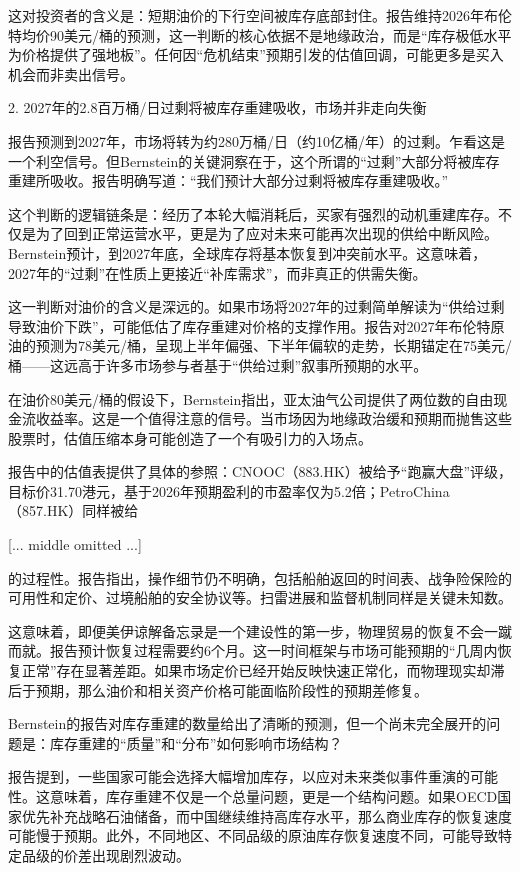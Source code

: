 \documentclass[11pt]{ctexart}
\begin{document}
这对投资者的含义是：短期油价的下行空间被库存底部封住。报告维持2026年布伦特均价90美元/桶的预测，这一判断的核心依据不是地缘政治，而是“库存极低水平为价格提供了强地板”。任何因“危机结束”预期引发的估值回调，可能更多是买入机会而非卖出信号。

2. 2027年的2.8百万桶/日过剩将被库存重建吸收，市场并非走向失衡

报告预测到2027年，市场将转为约280万桶/日（约10亿桶/年）的过剩。乍看这是一个利空信号。但Bernstein的关键洞察在于，这个所谓的“过剩”大部分将被库存重建所吸收。报告明确写道：“我们预计大部分过剩将被库存重建吸收。”

这个判断的逻辑链条是：经历了本轮大幅消耗后，买家有强烈的动机重建库存。不仅是为了回到正常运营水平，更是为了应对未来可能再次出现的供给中断风险。Bernstein预计，到2027年底，全球库存将基本恢复到冲突前水平。这意味着，2027年的“过剩”在性质上更接近“补库需求”，而非真正的供需失衡。

这一判断对油价的含义是深远的。如果市场将2027年的过剩简单解读为“供给过剩导致油价下跌”，可能低估了库存重建对价格的支撑作用。报告对2027年布伦特原油的预测为78美元/桶，呈现上半年偏强、下半年偏软的走势，长期锚定在75美元/桶——这远高于许多市场参与者基于“供给过剩”叙事所预期的水平。

在油价80美元/桶的假设下，Bernstein指出，亚太油气公司提供了两位数的自由现金流收益率。这是一个值得注意的信号。当市场因为地缘政治缓和预期而抛售这些股票时，估值压缩本身可能创造了一个有吸引力的入场点。

报告中的估值表提供了具体的参照：CNOOC（883.HK）被给予“跑赢大盘”评级，目标价31.70港元，基于2026年预期盈利的市盈率仅为5.2倍；PetroChina（857.HK）同样被给

[... middle omitted ...]

的过程性。报告指出，操作细节仍不明确，包括船舶返回的时间表、战争险保险的可用性和定价、过境船舶的安全协议等。扫雷进展和监督机制同样是关键未知数。

这意味着，即便美伊谅解备忘录是一个建设性的第一步，物理贸易的恢复不会一蹴而就。报告预计恢复过程需要约6个月。这一时间框架与市场可能预期的“几周内恢复正常”存在显著差距。如果市场定价已经开始反映快速正常化，而物理现实却滞后于预期，那么油价和相关资产价格可能面临阶段性的预期差修复。

Bernstein的报告对库存重建的数量给出了清晰的预测，但一个尚未完全展开的问题是：库存重建的“质量”和“分布”如何影响市场结构？

报告提到，一些国家可能会选择大幅增加库存，以应对未来类似事件重演的可能性。这意味着，库存重建不仅是一个总量问题，更是一个结构问题。如果OECD国家优先补充战略石油储备，而中国继续维持高库存水平，那么商业库存的恢复速度可能慢于预期。此外，不同地区、不同品级的原油库存恢复速度不同，可能导致特定品级的价差出现剧烈波动。
\end{document}
